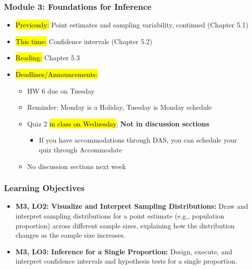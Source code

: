 
\begin{frame}
    \frametitle{Module 3: Foundations for Inference}
    \begin{itemize}
        \item \hl{Previously: }Point estimates and sampling variability, continued (Chapter 5.1)
        \item \hl{This time: }Confidence intervals (Chapter 5.2)
        \item \hl{Reading: }Chapter 5.3
        \item \hl{Deadlines/Announcements: }
        \begin{itemize}
            \item HW 6 due on Tuesday
            \item Reminder: Monday is a Holiday, Tuesday is Monday schedule
            \item Quiz 2 \hl{in class on Wednesday}, \textbf{Not in discussion sections}
            \begin{itemize}
                \item If you have accommodations through DAS, you can schedule your quiz through Accommodate
            \end{itemize}
            \item No discussion sections next week
        \end{itemize}
    \end{itemize}

\end{frame}

\begin{frame}
    \frametitle{Learning Objectives}
    \begin{itemize}
        \item \textbf{M3, LO2: Visualize and Interpret Sampling Distributions:} Draw and interpret sampling distributions for a point estimate (e.g., population proportion) across different sample sizes, explaining how the distribution changes as the sample size increases.
        \item \textbf{M3, LO3: Inference for a Single Proportion:} Design, execute, and interpret confidence intervals and hypothesis tests for a single proportion.
    \end{itemize}
\end{frame}
